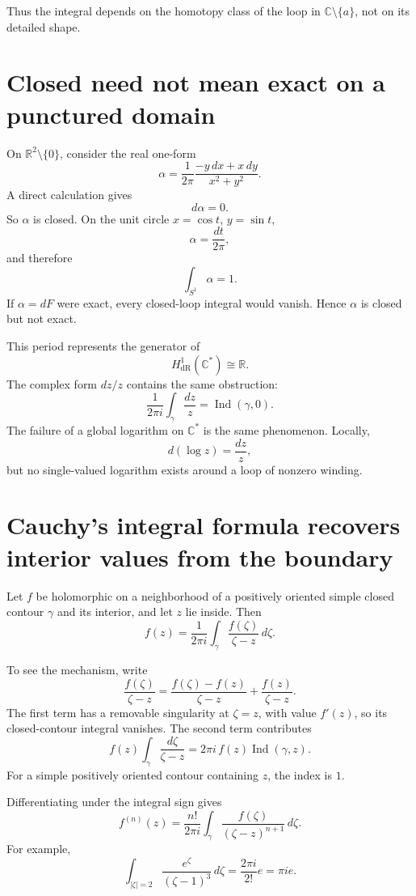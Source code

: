 Thus the integral depends on the homotopy class of the loop in \(\mathbb C\setminus\{a\}\), not on its detailed shape.

\section{Closed need not mean exact on a punctured domain}

On \(\mathbb R^2\setminus\{0\}\), consider the real one-form
\[
  \alpha
  =\frac{1}{2\pi}
  \frac{-y\,dx+x\,dy}{x^2+y^2}.
\]
A direct calculation gives
\[
  d\alpha=0.
\]
So \(\alpha\) is closed.  On the unit circle \(x=\cos t\), \(y=\sin t\),
\[
  \alpha=\frac{dt}{2\pi},
\]
and therefore
\[
  \int_{S^1}\alpha=1.
\]
If \(\alpha=dF\) were exact, every closed-loop integral would vanish.  Hence \(\alpha\) is closed but not exact.

This period represents the generator of
\[
  H^1_{\mathrm{dR}}(\mathbb C^*)\cong\mathbb R.
\]
The complex form \(dz/z\) contains the same obstruction:
\[
  \frac{1}{2\pi i}
  \int_\gamma\frac{dz}{z}
  =\operatorname{Ind}(\gamma,0).
\]
The failure of a global logarithm on \(\mathbb C^*\) is the same phenomenon.  Locally,
\[
  d(\log z)=\frac{dz}{z},
\]
but no single-valued logarithm exists around a loop of nonzero winding.

\section{Cauchy's integral formula recovers interior values from the boundary}

Let \(f\) be holomorphic on a neighborhood of a positively oriented simple closed contour \(\gamma\) and its interior, and let \(z\) lie inside.  Then
\[
  \boxed{
  f(z)=\frac{1}{2\pi i}
  \int_\gamma
  \frac{f(\zeta)}{\zeta-z}\,d\zeta.}
\]

To see the mechanism, write
\[
  \frac{f(\zeta)}{\zeta-z}
  =\frac{f(\zeta)-f(z)}{\zeta-z}
  +\frac{f(z)}{\zeta-z}.
\]
The first term has a removable singularity at \(\zeta=z\), with value \(f'(z)\), so its closed-contour integral vanishes.  The second term contributes
\[
  f(z)\int_\gamma\frac{d\zeta}{\zeta-z}
  =2\pi i\,f(z)\operatorname{Ind}(\gamma,z).
\]
For a simple positively oriented contour containing \(z\), the index is \(1\).

Differentiating under the integral sign gives
\[
  f^{(n)}(z)
  =\frac{n!}{2\pi i}
  \int_\gamma
  \frac{f(\zeta)}{(\zeta-z)^{n+1}}\,d\zeta.
\]
For example,
\[
  \int_{|\zeta|=2}
  \frac{e^\zeta}{(\zeta-1)^3}\,d\zeta
  =\frac{2\pi i}{2!}e
  =\pi i e.
\]


